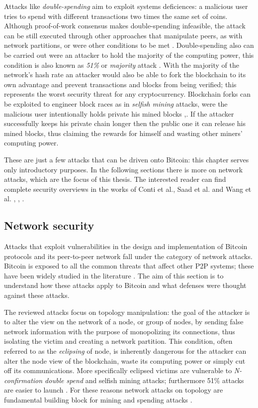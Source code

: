 \documentclass[12pt, letterpaper, twoside]{article}
\begin{document}
Attacks like \textit{double-spending} aim to exploit systems deficiences: a malicious user tries to spend with different transactions two times the same set of coins. Although proof-of-work consensus makes double-spending infeasible, the attack can be still executed through other approaches that manipulate peers, as with network partitions, or were other conditions to be met \cite{doublespendfastpay}. Double-spending also can be carried out were an attacker to hold the majority of the computing power, this condition is also known as \textit{51\%} or \textit{majority} attack \cite{51atk}. With the majority of the network's hash rate an attacker would also be able to fork the blockchain to its own advantage and prevent transactions and blocks from being verified; this represents the worst security threat for any cryptocurrency. Blockchain forks can be exploited to engineer block races as in \textit{selfish mining} attacks, were the malicious user intentionally holds private his mined blocks \cite{selfishmining},\cite{leelavimolsilp2018selfish}. If the attacker successfully keeps his private chain longer then the public one it can release his mined blocks, thus claiming the rewards for himself and wasting other miners' computing power.

These are just a few attacks that can be driven onto Bitcoin: this chapter serves only introductory purposes. In the following sections there is more on network attacks, which are the focus of this thesis. The interested reader can find complete security overviews in the works of Conti et al., Saad et al. and Wang et al. \cite{completeattacksurvey}, \cite{saad2019attacksurface}, \cite{secpermissionlessblock}.

\subsection{Network security}\label{netsec}
Attacks that exploit vulnerabilities in the design and implementation of Bitcoin protocols and its peer-to-peer network fall under the category of network attacks. Bitcoin is exposed to all the common threats that affect other P2P systems; these have been widely studied in the literature \cite{toucedafakeboot}. The aim of this section is to understand how these attacks apply to Bitcoin and what defenses were thought against these attacks.

The reviewed attacks focus on topology manipulation: the goal of the attacker is to alter the view on the network of a node, or group of nodes, by sending false network information with the purpose of monopolizing its connections, thus isolating the victim and creating a network partition. This condition, often referred to as the \textit{eclipsing} of node, is inherently dangerous for the attacker can alter the node view of the blockchain, waste its computing power or simply cut off its communications.  More specifically eclipsed victims are vulnerable to \textit{N-confirmation double spend} and selfish mining attacks; furthermore 51\% attacks are easier to launch \cite{eclipseatk}. For these reasons network attacks on topology are fundamental building block for mining and spending attacks \cite{dotan2020surveychallenges}.
\end{document}
